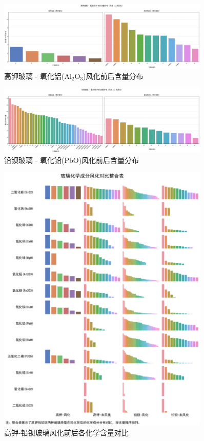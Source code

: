\documentclass[withoutpreface,bwprint]{cumcmthesis}
\begin{document}
\begin{figure}[H]
\centering
\includegraphics[width=0.9\textwidth]{figures/1.2/高钾玻璃 - 氧化铝(Al2O3)含量分布（风化 vs 未风化）.png}
\caption{高钾玻璃 - 氧化铝(Al$_2$O$_3$)风化前后含量分布}
\label{fig:高钾玻璃 - 氧化铝(Al$_2$O$_3$)风化前后含量分布}
\end{figure}

\begin{figure}[H]
\centering
\includegraphics[width=0.9\textwidth]{figures/1.2/铅钡玻璃 - 氧化铅(PbO)含量分布（风化 vs 未风化）.png}
\caption{铅钡玻璃 - 氧化铅(PbO)风化前后含量分布}
\label{fig:铅钡玻璃 - 氧化铅(PbO)风化前后含量分布}
\end{figure}

\begin{figure}[H]
\centering
\includegraphics[width=0.9\textwidth]{figures/1.2/玻璃化学成分风化对比整合表(14x4)V3.png}
\caption{高钾-铅钡玻璃风化前后各化学含量对比}
\label{fig:高钾-铅钡玻璃风化前后各化学含量对比}
\end{figure}
\end{document}

